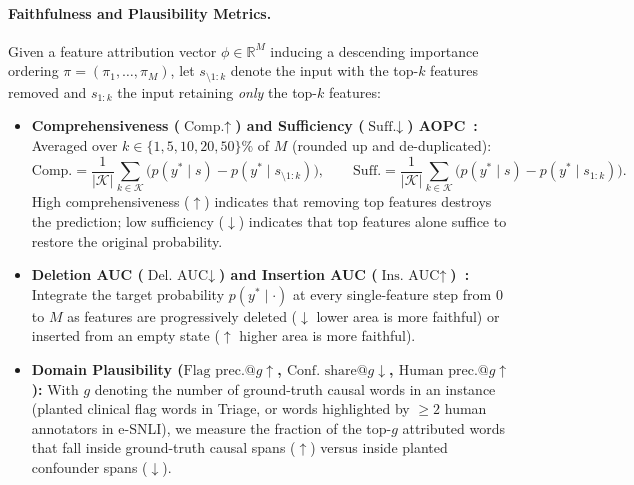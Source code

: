 \documentclass[10pt]{article}
\begin{document}
\paragraph{Faithfulness and Plausibility Metrics.}
Given a feature attribution vector $\phi \in \mathbb{R}^M$ inducing a descending importance ordering $\pi = (\pi_1, \dots, \pi_M)$, let $s_{\setminus 1:k}$ denote the input with the top-$k$ features removed and $s_{1:k}$ the input retaining \emph{only} the top-$k$ features:
\begin{itemize}
\item \textbf{Comprehensiveness ($\text{Comp.} \uparrow$) and Sufficiency ($\text{Suff.} \downarrow$) AOPC~\cite{deyoung2020}:} Averaged over $k \in \{1, 5, 10, 20, 50\}\%$ of $M$ (rounded up and de-duplicated):
\begin{equation}
\text{Comp.} = \frac{1}{|\mathcal{K}|} \sum_{k \in \mathcal{K}} \big(p(y^* \mid s) - p(y^* \mid s_{\setminus 1:k})\big), \qquad
\text{Suff.} = \frac{1}{|\mathcal{K}|} \sum_{k \in \mathcal{K}} \big(p(y^* \mid s) - p(y^* \mid s_{1:k})\big).
\end{equation}
High comprehensiveness ($\uparrow$) indicates that removing top features destroys the prediction; low sufficiency ($\downarrow$) indicates that top features alone suffice to restore the original probability.
\item \textbf{Deletion AUC ($\text{Del.\ AUC} \downarrow$) and Insertion AUC ($\text{Ins.\ AUC} \uparrow$)~\cite{petsiuk2018}:} Integrate the target probability $p(y^* \mid \cdot)$ at every single-feature step from $0$ to $M$ as features are progressively deleted ($\downarrow$ lower area is more faithful) or inserted from an empty state ($\uparrow$ higher area is more faithful).
\item \textbf{Domain Plausibility ($\text{Flag prec.@}g \uparrow$, $\text{Conf.\ share@}g \downarrow$, $\text{Human prec.@}g \uparrow$):} With $g$ denoting the number of ground-truth causal words in an instance (planted clinical flag words in Triage, or words highlighted by $\ge 2$ human annotators in e-SNLI), we measure the fraction of the top-$g$ attributed words that fall inside ground-truth causal spans ($\uparrow$) versus inside planted confounder spans ($\downarrow$).
\end{itemize}
\end{document}
